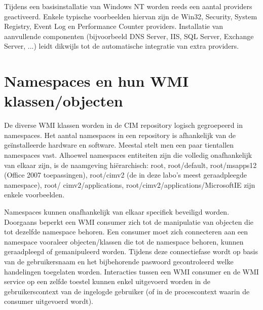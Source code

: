 \documentclass[11pt,a4paper]{report}
\begin{document}
\par Tijdens een basisinstallatie van Windows NT worden reeds een aantal providers geactiveerd. Enkele typische voorbeelden hiervan zijn de Win32, Security, System Registry, Event Log en Performance Counter providers. Installatie van aanvullende componenten (bijvoorbeeld DNS Server, IIS, SQL Server, Exchange Server, ...) leidt dikwijls tot de automatische integratie van extra providers.
\section{Namespaces en hun WMI klassen/objecten}
De diverse WMI klassen worden in de CIM repository logisch gegroepeerd in namespaces. Het aantal namespaces in een repository is afhankelijk van de geïnstalleerde hardware en software. Meestal stelt men een paar tientallen namespaces vast. Alhoewel namespaces entiteiten zijn die volledig onafhankelijk van elkaar zijn, is de naamgeving hiërarchisch: root, root/default, root/msapps12 (Office 2007 toepassingen), root/cimv2 (de in deze labo's meest geraadpleegde namespace), root/ cimv2/applications, root/cimv2/applications/MicrosoftIE zijn enkele voorbeelden.
\par Namespaces kunnen onafhankelijk van elkaar specifiek beveiligd worden. Doorgaans beperkt een WMI consumer zich tot de manipulatie van objecten die tot dezelfde namespace behoren. Een consumer moet zich connecteren aan een namespace vooraleer objecten/klassen die tot de namespace behoren, kunnen geraadpleegd of gemanipuleerd worden. Tijdens deze connectiefase wordt op basis van de gebruikersnaam en het bijbehorende paswoord gecontroleerd welke handelingen toegelaten worden. Interacties tussen een WMI consumer en de WMI service op een zelfde toestel kunnen enkel uitgevoerd worden in de gebruikerscontext van de ingelogde gebruiker (of in de procescontext waarin de consumer uitgevoerd wordt).
\end{document}
